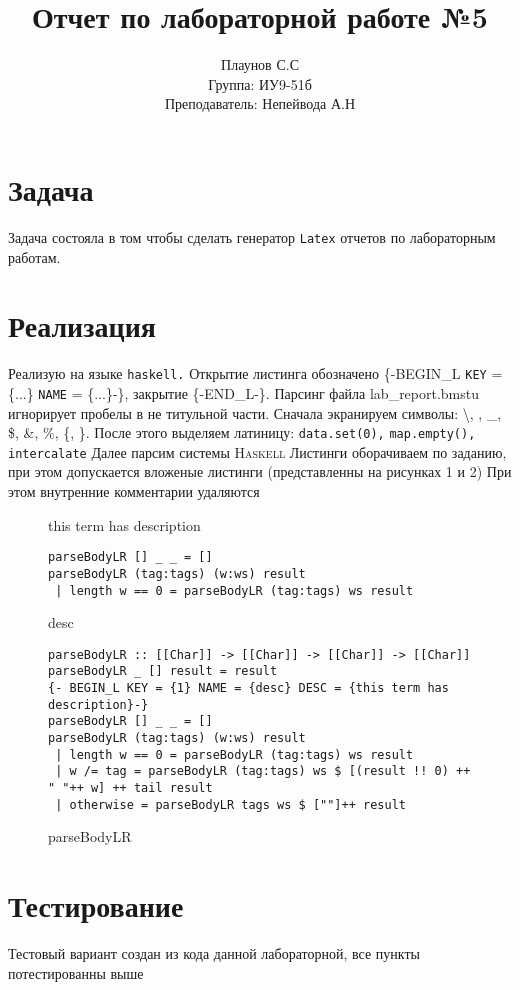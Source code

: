 \documentclass[14pt,russian]{scrartcl}
\title{Отчет по лабораторной работе №5}
\author{Плаунов С.С\\Группа: ИУ9-51б\\Преподаватель: Непейвода А.Н}
\begin{document}
\maketitle
\section{Задача}
 Задача состояла в том чтобы сделать генератор \texttt{Latex}
 отчетов по лабораторным работам.
\section{Реализация}
 Реализую на языке \texttt{haskell.}
 Открытие листинга обозначено \{-BEGIN\_L \texttt{KEY}
 = \{...\} \texttt{NAME}
 = \{...\}-\}, закрытие \{-END\_L-\}. Парсинг файла lab\_report.bmstu игнорирует пробелы в не титульной части. Сначала экранируем символы: \textbackslash, \textnumero, \_, \$, \&, \%, \{, \}. После этого выделяем латиницу: \texttt{data.set(0),}
 \texttt{map.empty(),}
 \texttt{intercalate}
 Далее парсим системы \textsc{Haskell}
 Листинги оборачиваем по заданию, при этом допускается вложеные листинги (представленны на рисунках 1 и 2) При этом внутренние комментарии удаляются \begin{figure}[htb]
\footnotesize
this term has description\begin{verbatim}
parseBodyLR [] _ _ = []
parseBodyLR (tag:tags) (w:ws) result
 | length w == 0 = parseBodyLR (tag:tags) ws result
\end{verbatim}
\caption{desc}
\end{figure}
\begin{figure}[htb]
\footnotesize
\begin{verbatim}
parseBodyLR :: [[Char]] -> [[Char]] -> [[Char]] -> [[Char]]
parseBodyLR _ [] result = result
{- BEGIN_L KEY = {1} NAME = {desc} DESC = {this term has description}-}
parseBodyLR [] _ _ = []
parseBodyLR (tag:tags) (w:ws) result
 | length w == 0 = parseBodyLR (tag:tags) ws result
 | w /= tag = parseBodyLR (tag:tags) ws $ [(result !! 0) ++ " "++ w] ++ tail result
 | otherwise = parseBodyLR tags ws $ [""]++ result
\end{verbatim}
\caption{parseBodyLR}
\end{figure}
\section{Тестирование}
 Тестовый вариант создан из кода данной лабораторной, все пункты потестированны выше
\end{document}
